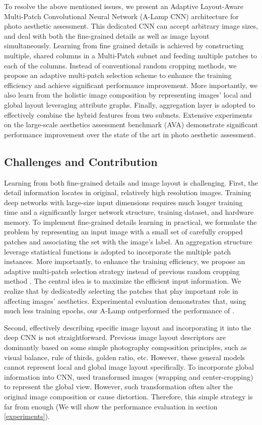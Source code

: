 \documentclass[10pt,twocolumn,letterpaper]{article}
\begin{document}
To resolve the above mentioned issues, we present an Adaptive Layout-Aware Multi-Patch Convolutional Neural Network (A-Lamp CNN) architecture for photo aesthetic assessment. This dedicated CNN can accept arbitrary image sizes, and deal with both the fine-grained details as well as image layout simultaneously.
Learning from fine grained details is achieved by constructing multiple, shared columns in a Multi-Patch subnet and feeding multiple patches to each of the columns. Instead of conventional random cropping methods, we propose an adaptive multi-patch selection scheme to enhance the training efficiency and achieve significant performance improvement. More importantly, we also learn from the holistic image composition by representing images’ local and global layout leveraging attribute graphs. Finally, aggregation layer is adopted to effectively combine the hybrid features from two subnets. Extensive experiments on the large-scale aesthetics assessment benchmark (AVA) demonstrate significant performance improvement over the state of the art in photo aesthetic assessment.

\subsection{Challenges and Contribution} \label{challenge}
Learning from both fine-grained details and image layout is challenging.
First, the detail information locates in original, relatively high resolution images. Training deep networks with large-size input dimensions requires much longer training time and a significantly larger network structure, training dataset, and hardware memory. To implement fine-grained details learning in practical, we formulate the problem by representing an input image with a small set of carefully cropped patches and associating the set with the image's label. An aggregation structure leverage statistical functions is adopted to incorporate the multiple patch instances.
More importantly, to enhance the training efficiency, we propose an adaptive multi-patch selection strategy instead of previous random cropping method \cite{Lu:2015:ICCV}. The central idea is to maximize the efficient input information. We realize that by dedicatedly selecting the patches that play important role in affecting images' aesthetics. Experimental evaluation demonstrates that, using much less training epochs, our A-Lamp outperformed the performance of \cite{Lu:2015:ICCV}. 

Second, effectively describing specific image layout and incorporating it into the deep CNN is not straightforward. Previous image layout descriptors are dominantly based on some simple photography composition principles, such as visual balance, rule of thirds, golden ratio, etc. However, these general models cannot represent local and global image layout specifically. To incorporate global information into CNN, \cite{Lu:2014:TMM:rating} used transformed images (wrapping and center-cropping) to represent the global view.
However, such transformation often alter the original image composition or cause distortion. Therefore, this simple strategy is far from enough (We will show the performance evaluation in section \ref{experiments}).
\end{document}
